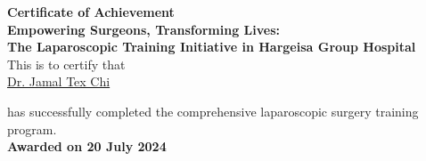 \documentclass[a4paper, landscape]{article}
\begin{document}
\begin{center}

{\Huge\textbf{Certificate of Achievement}}\\[0.6cm]
{\Large\textbf{Empowering Surgeons, Transforming Lives:\\[0.1cm]
The Laparoscopic Training Initiative in Hargeisa Group Hospital}} \\[0.4cm]
\raisebox{-0.6\height}{}  \hspace{0.3cm}
\large This is to certify that \hspace{0.3cm}
\raisebox{-0.6\height}{} \\[0.4cm]

{\Huge\underline{Dr. Jamal Tex Chi}}\\[0.2cm]



\Large



\vspace{0.3cm}

has successfully completed the comprehensive laparoscopic surgery training program. \\

\textbf{Awarded on 20 July 2024}

\vspace{1.0cm} 








\end{center}
\end{document}
